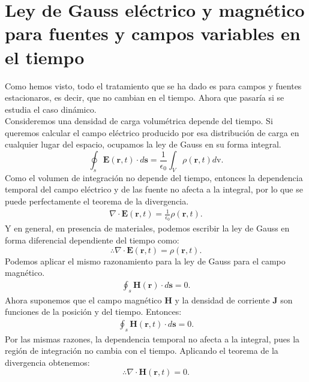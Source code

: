 \documentclass[11pt,fleqn]{book} %
\begin{document}
\section{Ley de Gauss el\'ectrico y magn\'etico para fuentes y campos variables en el tiempo}
Como hemos visto, todo el tratamiento que se ha dado es para campos y fuentes estacionaros, es decir, que no cambian en el tiempo. Ahora que pasar\'ia si se estudia el caso din\'amico.\\
Consideremos una densidad de carga volum\'etrica depende del tiempo. Si queremos calcular el campo el\'ectrico producido por esa distribuci\'on de carga en cualquier lugar del espacio, ocupamos la ley de Gauss en su forma integral.
\begin{equation}
\oint_{s} \textbf{E}(\textbf{r},t)\cdot d\textbf{s}=\frac{1}{\epsilon_{0}}\int_{V} \rho(\textbf{r},t)d \text{v}.
\end{equation}
Como el volumen de integraci\'on no depende del tiempo, entonces la dependencia temporal del campo el\'ectrico y de las fuente no afecta a la integral, por lo que se puede perfectamente el teorema de la divergencia.
\begin{eqnarray*}
\nabla\cdot\textbf{E}(\textbf{r},t)=\frac{1}{\epsilon_{0}}\rho(\textbf{r},t).
\end{eqnarray*}
Y en general, en presencia de materiales, podemos escribir la ley de Gauss en forma diferencial dependiente del tiempo como:
\begin{equation}
\therefore  \nabla\cdot\textbf{E}(\textbf{r},t)=\rho(\textbf{r},t).
\end{equation}
Podemos aplicar el mismo razonamiento para la ley de Gauss para el campo magn\'etico.\\
\begin{eqnarray*}
\oint_{s} \textbf{H}(\textbf{r})\cdot d\textbf{s}=0.
\end{eqnarray*}
Ahora suponemos que el campo magn\'etico $\textbf{H}$ y la densidad de corriente $\textbf{J}$ son funciones de la posici\'on y del tiempo.
Entonces:
\begin{eqnarray*}
\oint_{s} \textbf{H}(\textbf{r},t)\cdot d\textbf{s}=0.
\end{eqnarray*}
Por las mismas razones, la dependencia temporal no afecta a la integral, pues la regi\'on de integraci\'on no cambia con el tiempo. Aplicando el teorema de la divergencia obtenemos:
\begin{equation}
\therefore \nabla\cdot \textbf{H}(\textbf{r},t)=0.
\end{equation}
\end{document}
